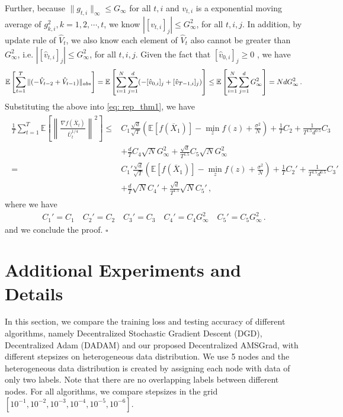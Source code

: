 \documentclass{article} %
\begin{document}
Further, because $\|g_{t,i}\|_{\infty} \leq G_{\infty}$ for all $t,i$ and $v_{t,i}$ is a exponential moving average of $g_{k,i}^2, k=1,2,\cdots,t$, we know $|[v_{t,i}]_j| \leq G^2_{\infty}$, for all $t,i,j$. In addition, by update rule of $\hat V_t$, we also know each element of $\hat V_{t}$ also cannot be greater than $G^2_{\infty}$, i.e. $|[\hat v_{t,i}]_j| \leq G^2_{\infty}$, for all $t,i,j$. 
Given the fact that $[\hat v_{0,i}]_j \geq 0$ , we have 
\begin{align}\notag
\mathbb E \left[ \sum_{t=1}^{T}   \|    (- \hat V_{t-2} + \hat V_{t-1} ) \|_{abs} \right]  = \mathbb E \left[   \sum_{i=1}^N \sum_{j=1}^d    (- [\hat v_{0,i}]_j + [\hat v_{T-1,i}]_j ) \right]  
\leq  \mathbb E \left[   \sum_{i=1}^N \sum_{j=1}^d  G_{\infty}^2   \right] =  Nd G_{\infty}^2 \, .
\end{align}
Substituting the above into \eqref{eq: rep_thm1}, we have 
\begin{align}\label{eq: sub_thm1}
\begin{split}
\frac{1}{T}\sum_{t=1}^T  \mathbb E \left [\left\|\frac{\nabla f( \overline X_{t})}{\overline U_{t}^{1/4}}\right\|^2  \right]
\leq  & C_1 \frac{\sqrt{d}}{\sqrt{T}} \left(\mathbb E  [f( \overline X_{1})]  - \min_{z} f(z)  + \frac{\sigma^2}{N}\right)  +  \frac{ 1}{T} C_2    + \frac{1}{T^{1.5}d^{0.5}} C_3  \\ 
&+   \frac{d}{T } C_4 \sqrt{N} G_{\infty}^2  + \frac{\sqrt{d}}{T^{1.5} } C_5  \sqrt{N} G_{\infty}^2  \\
=  & C_1' \frac{\sqrt{d}}{\sqrt{T}} \left(\mathbb E  [f( \overline X_{1})]  - \min_{z} f(z)  + \frac{\sigma^2}{N}\right)  +  \frac{ 1}{T} C_2'    + \frac{1}{T^{1.5}d^{0.5}} C_3'  \\ 
&+   \frac{d}{T }\sqrt{N} C_4' + \frac{\sqrt{d}}{T^{1.5} } \sqrt{N} C_5'\, ,
\end{split}
\end{align}
where we have 
\begin{align}
C_1' = C_1 \quad C_2' = C_2 \quad C_3' = C_3 \quad C_4' = C_4G_{\infty}^2 \quad C_5' = C_5 G_{\infty}^2 \, .
\end{align}
and we conclude the proof. \hfill $\square$

\vspace{0.2in}


\section{Additional Experiments and Details}\label{app: experiments}
In this section, we compare the training loss and testing accuracy of different algorithms, namely Decentralized Stochastic Gradient Descent (DGD), Decentralized Adam (DADAM) and our proposed Decentralized AMSGrad,  with different stepsizes on heterogeneous data distribution. 
We use 5 nodes and the heterogeneous data distribution is created by assigning each node with data of only two labels.
Note that there are no overlapping labels between different nodes. 
For all algorithms, we compare stepsizes in the grid $[10^{-1}, 10^{-2}, 10^{-3}, 10^{-4}, 10^{-5}, 10^{-6}]$. 
\end{document}
